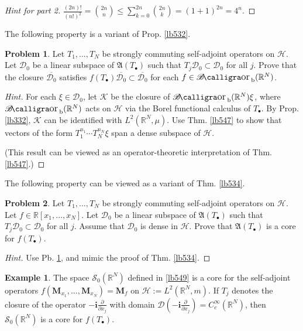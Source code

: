 \documentclass[12pt,b5paper,notitlepage]{article}
\theoremstyle{definition}
\newtheorem{eg}[df]{Example}
\newtheorem{prob}{\color{red}Problem}[section]
\theoremstyle{plain}
\DeclareMathOperator{\Borb}{{\mathscr{B}\text{\kern -2pt {\calligra\large or}}\,}_{\mathrm b}}
\newcommand{\ovl}{\overline}
\newcommand{\Dom}{\mathscr{D}}
\newcommand{\im}{\mathbf{i}}
\newcommand{\blt}{\bullet}
\newcommand{\Rbb}{\mathbb R}
\newcommand{\MH}{\mathcal H}
\newcommand{\MK}{\mathcal K}
\newcommand{\MS}{\mathcal S}
\newcommand{\Mbf}{\mathbf M}
\newcommand{\FA}{\mathfrak A}
\numberwithin{equation}{section}
\begin{document}
\begin{proof}[Hint for part 2]
$\frac{(2n)!}{(n!)^2}={2n\choose n}\leq\sum_{k=0}^{2n}{2n\choose k}=(1+1)^{2n}=4^n$.
\end{proof}

The following property is a variant of Prop. \ref{lb532}.

\begin{prob}\label{lb555}
Let $T_1,\dots,T_N$ be strongly commuting self-adjoint operators on $\MH$. Let $\Dom_0$ be a linear subspace of $\FA(T_\blt)$ such that $T_j\Dom_0\subset\Dom_0$ for all $j$. Prove that the closure $\ovl{\Dom_0}$ satisfies $f(T_\blt)\ovl{\Dom_0}\subset\ovl{\Dom_0}$ for each $f\in\Borb(\Rbb^N)$.
\end{prob}

\begin{proof}[Hint]
For each $\xi\in\Dom_0$, let $\MK$ be the closure of $\Borb(\Rbb^N)\xi$, where $\Borb(\Rbb^N)$ acts on $\MH$ via the Borel functional calculus of $T_\blt$. By Prop. \ref{lb332}, $\MK$ can be identified with $L^2(\Rbb^N,\mu)$. Use Thm. \ref{lb547} to show that vectors of the form $T_1^{n_1}\cdots T_N^{n_N}\xi$ span a dense subspace of $\MH$. 

(This result can be viewed as an operator-theoretic interpretation of Thm. \ref{lb547}.)
\end{proof}

The following property can be viewed as a variant of Thm. \ref{lb534}.

\begin{prob}\label{lb558}
Let $T_1,\dots,T_N$ be strongly commuting self-adjoint operators on $\MH$. Let $f\in\Rbb[x_1,\dots,x_N]$. Let $\Dom_0$ be a linear subspace of $\FA(T_\blt)$ such that $T_j\Dom_0\subset\Dom_0$ for all $j$. Assume that $\Dom_0$ is dense in $\MH$. Prove that $\FA(T_\blt)$ is a core for $f(T_\blt)$.
\end{prob}


\begin{proof}[Hint]
Use Pb. \ref{lb555}, and mimic the proof of Thm. \ref{lb534}.
\end{proof}



\begin{eg}\label{lb560}
The space $\MS_0(\Rbb^N)$ defined in \ref{lb549} is a core for the self-adjoint operators $f(\Mbf_{x_1},\dots,\Mbf_{x_N})=\Mbf_f$ on $\MH:=L^2(\Rbb^N,m)$. If $T_j$ denotes the closure of the operator $-\im\frac{\partial}{\partial x_j}$ with domain $\Dom(-\im\frac{\partial}{\partial x_j})=C_c^\infty(\Rbb^N)$, then $\MS_0(\Rbb^N)$ is a core for $f(T_\blt)$. 
\end{eg}
\end{document}

